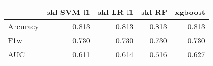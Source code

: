 \begin{tabular}{lrrrr}
\toprule
{} &  skl-SVM-l1 &  skl-LR-l1 &  skl-RF &  xgboost \\
\midrule
Accuracy &       0.813 &      0.813 &   0.813 &    0.813 \\
F1w      &       0.730 &      0.730 &   0.730 &    0.730 \\
AUC      &       0.611 &      0.614 &   0.616 &    0.627 \\
\bottomrule
\end{tabular}
